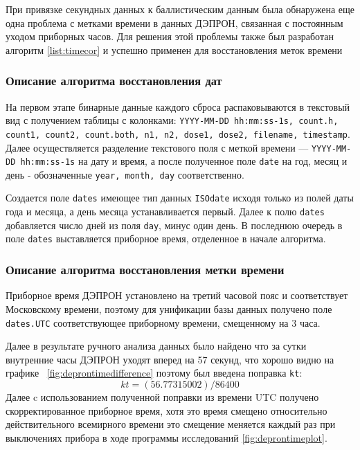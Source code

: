 При привязке секундных данных к баллистическим данным была обнаружена еще одна проблема с метками времени в данных ДЭПРОН, связанная с постоянным уходом приборных часов. Для решения этой проблемы также был разработан алгоритм \ref{list:timecor} и успешно применен для восстановления меток времени

\subsubsection{Описание алгоритма восстановления дат}

На первом этапе бинарные данные каждого сброса распаковываются в текстовый вид с получением таблицы с колонками: \texttt{YYYY-MM-DD hh:mm:ss-1s,	count.h, count1,	count2,	count.both,	n1,	n2,	dose1, dose2,	filename,	timestamp}. Далее осуществляется разделение текстового поля с меткой времени --- \texttt{YYYY-MM-DD hh:mm:ss-1s} на дату и время, а после полученное поле \texttt{date} на год, месяц и день - обозначенные \texttt{year, month, day} соответственно.

Создается поле \texttt{dates} имеющее тип данных \texttt{ISOdate} исходя только из полей даты года и месяца, а день месяца устанавливается первый. Далее к полю \texttt{dates} добавляется число дней из поля \texttt{day}, минус один день. В последнюю очередь в поле \texttt{dates} выставляется приборное время, отделенное в начале алгоритма.

\subsubsection{Описание алгоритма восстановления метки времени}

Приборное время ДЭПРОН установлено на третий часовой пояс и соответствует Московскому времени, поэтому для унификации базы данных получено поле \texttt{dates.UTC} соответствующее приборному времени, смещенному на 3 часа.



Далее в результате ручного анализа данных было найдено что за сутки внутренние часы ДЭПРОН уходят вперед на 57 секунд, что хорошо видно на графике~ \ref{fig:deprontimedifference} поэтому был введена поправка \texttt{kt}: \[ kt = (56.77315002) /86400 \] Далее c использованием полученной поправки из времени UTC получено скорректированное приборное время, хотя это время смещено относительно действительного всемирного времени это смещение меняется каждый раз при выключениях прибора в ходе программы исследований \ref{fig:deprontimeplot}.

